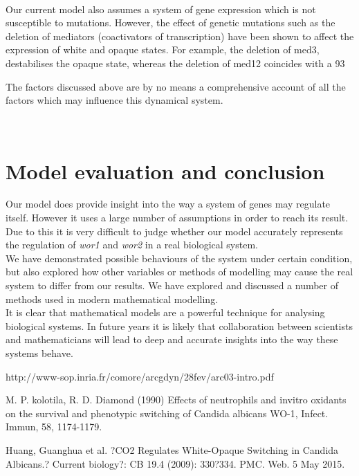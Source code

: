 \documentclass[]{article}
\begin{document}
\\
Our current model also assumes a system of gene expression which is not susceptible to mutations. However, the effect of genetic mutations such as the deletion of mediators (coactivators of transcription) have been shown to affect the expression of white and opaque states. For example, the deletion of med3, destabilises the opaque state, whereas the deletion of med12 coincides with a 93%

The factors discussed above are by no means a comprehensive account of all the factors which may influence this dynamical system.  %


\\
\section{Model evaluation and conclusion}
Our model does provide insight into the way a system of genes may regulate itself. However it uses a large number of assumptions in order to reach its result. Due to this it is very difficult to judge whether our model accurately represents the regulation of \textit{wor1} and \textit{wor2} in a real biological system.
\\
We have demonstrated possible behaviours of the system under certain condition, but also explored how other variables or methods of modelling may cause the real system to differ from our results. We have explored and discussed a number of methods used in modern mathematical modelling.
\\
It is clear that mathematical models are a powerful technique for analysing biological systems. In future years it is likely that collaboration between scientists and mathematicians will lead to deep and accurate insights into the way these systems behave.





http://www-sop.inria.fr/comore/arcgdyn/28fev/arc03-intro.pdf

M. P. kolotila, R. D. Diamond (1990) Effects of neutrophils and invitro oxidants on the survival and phenotypic switching of Candida albicans WO-1, Infect. Immun, 58, 1174-1179.

Huang, Guanghua et al. ?CO2 Regulates White-Opaque Switching in Candida Albicans.? Current biology?: CB 19.4 (2009): 330?334. PMC. Web. 5 May 2015.
\end{document}
